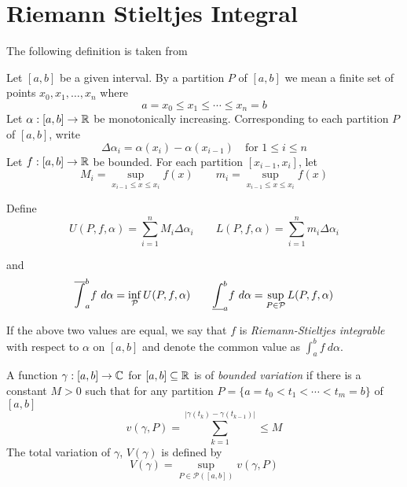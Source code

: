 \section{Riemann Stieltjes Integral}
The following definition is taken from \cite{babyrudin}

\begin{definition}
    Let $[a,b]$ be a given interval. By a partition $P$ of $[a,b]$ we mean a finite set of points $x_0,x_1,\ldots,x_n$ where 
    \begin{equation*}
        a = x_0\le x_1\le\cdots\le x_n = b
    \end{equation*}
    Let $\alpha: [a,b]\to\mathbb{R}$ be monotonically increasing. Corresponding to each partition $P$ of $[a,b]$, write 
    \begin{equation*}
        \Delta\alpha_i = \alpha(x_i) - \alpha(x_{i - 1})\quad\text{for $1\le i\le n$}
    \end{equation*}
    Let $f:[a,b]\to\mathbb{R}$ be bounded. For each partition $[x_{i - 1}, x_i]$, let 
    \begin{equation*}
        M_i = \sup_{x_{i - 1}\le x\le x_i}f(x)\qquad m_i = \sup_{x_{i - 1}\le x\le x_i} f(x)
    \end{equation*}

    Define 
    \begin{equation*}
        U(P,f,\alpha) = \sum_{i = 1}^n M_i\Delta\alpha_i\qquad L(P,f,\alpha) = \sum_{i = 1}^n m_i\Delta\alpha_i
    \end{equation*}

    and 
    \begin{equation*}
        \overline\int_a^b f~d\alpha = \inf_{\mathcal P}U(P,f,\alpha)\qquad\underline\int_a^bf~d\alpha = \sup_{P\in\mathcal P}L(P,f,\alpha)
    \end{equation*}

    If the above two values are equal, we say that $f$ is \textit{Riemann-Stieltjes integrable} with respect to $\alpha$ on $[a,b]$ and denote the common value as $\int_a^b f~d\alpha$.
\end{definition}

\begin{definition}
    A function $\gamma: [a,b]\to\mathbb{C}$ for $[a,b]\subseteq\mathbb{R}$ is of \textit{bounded variation} if there is a constant $M > 0$ such that for any partition $P = \{a = t_0 < t_1 < \cdots < t_m = b\}$ of $[a,b]$ 
    \begin{equation*}
        v(\gamma, P) = \sum_{k = 1}^|\gamma(t_k) - \gamma(t_{k - 1})|\le M
    \end{equation*}
    The total variation of $\gamma$, $V(\gamma)$ is defined by 
    \begin{equation*}
        V(\gamma) = \sup_{P\in\mathcal P([a,b])} v(\gamma, P)
    \end{equation*}
\end{definition}

